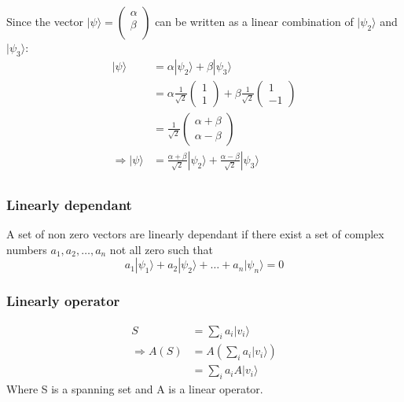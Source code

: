 \documentclass{article}
\begin{document}
Since the vector $|\psi\rangle = \begin{pmatrix}
    \alpha \\
    \beta \\
\end{pmatrix}$ can be written as a linear combination of $|\psi_2\rangle$ and $|\psi_3\rangle$:
\begin{equation}
    \begin{split}
        |\psi\rangle & = \alpha|\psi_2\rangle + \beta|\psi_3\rangle \\
        & = \alpha\frac{1}{\sqrt{2}}\begin{pmatrix}1 \\ 1 \end{pmatrix} + \beta\frac{1}{\sqrt{2}}\begin{pmatrix}1 \\ -1 \end{pmatrix} \\
        & = \frac{1}{\sqrt{2}}\begin{pmatrix}\alpha + \beta \\ \alpha - \beta \end{pmatrix} \\
        \Longrightarrow |\psi\rangle & = \frac{\alpha + \beta}{\sqrt{2}}|\psi_2\rangle + \frac{\alpha - \beta}{\sqrt{2}}|\psi_3\rangle \\
    \end{split}
\end{equation}

\subsubsection{Linearly dependant}

A set of non zero vectors are linearly dependant if there exist a set of complex numbers $a_1, a_2, \dots, a_n$ not all zero such that
\begin{equation}
    a_1|\psi_1\rangle + a_2|\psi_2\rangle + \dots + a_n|\psi_n\rangle = 0
\end{equation}

\subsubsection{Linearly operator}

\begin{equation}
    \begin{split}
        S & = \sum_{i}^{} a_i|v_i\rangle \\
        \Longrightarrow A(S) & = A(\sum_{i}^{} a_i|v_i\rangle) \\
        & = \sum_{i}^{} a_i A|v_i\rangle
    \end{split}
\end{equation}
Where S is a spanning set and A is a linear operator.
\end{document}
